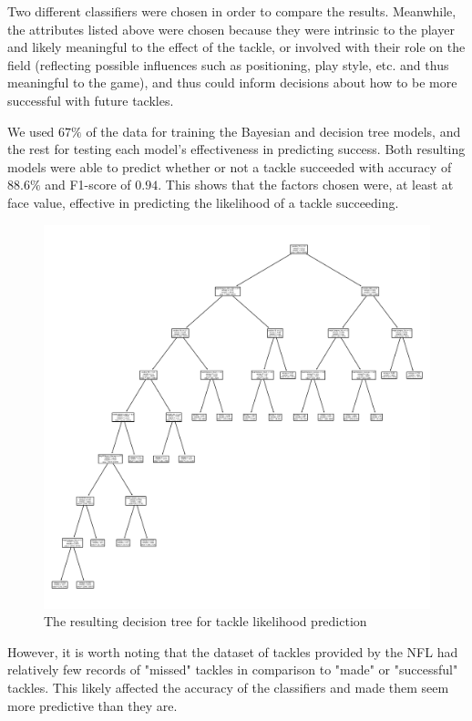 \documentclass[bibtex, sigconf, hyperref={colorlinks=true,linkcolor=blue,urlcolor=blue}]{acmart}
\begin{document}
Two different classifiers were chosen in order to compare the results. Meanwhile,
the attributes listed above were chosen because they were intrinsic to the player
and likely meaningful to the effect of the tackle, or involved with their role on the field
(reflecting possible influences such as positioning, play style, etc. and thus
meaningful to the game), and thus could inform decisions about how to be more successful
with future tackles.

We used $67\%$ of the data for training the Bayesian and decision tree models, and the rest for
testing each model's effectiveness in predicting success. Both resulting models were able to
predict whether or not a tackle succeeded with accuracy of $88.6\%$ and F1-score
of $0.94$. This shows that the factors chosen were, at least at face value, effective in
predicting the likelihood of a tackle succeeding.

\begin{figure}[h]
  \centering
  \includegraphics[width=\linewidth]
  {decision_tree.png}
  \caption{The resulting decision tree for tackle likelihood prediction}
\end{figure}

However, it is worth noting that the dataset of tackles provided by the NFL had relatively few records
of "missed" tackles in comparison to "made" or "successful" tackles. This likely affected the accuracy
of the classifiers and made them seem more predictive than they are.
\end{document}

